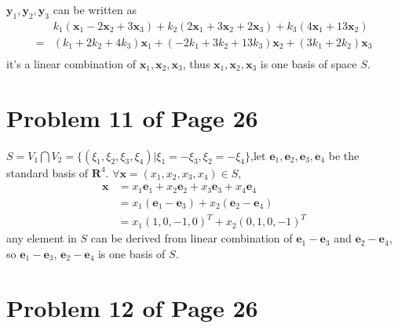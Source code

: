\documentclass[12pt,a4paper]{article}
\newcommand{\mysection}[2]{
\section{Problem #1 of Page #2}	
	}
\begin{document}
$\bm{y}_1,\bm{y}_2,\bm{y}_3$ can be written as
\begin{equation} 
\begin{split}
&k_1 (\bm{x}_1 - 2\bm{x}_2 + 3\bm{x}_3)+
 k_2(2\bm{x}_1 + 3\bm{x}_2 + 2\bm{x}_3)
 + k_3(4\bm{x}_1 + 13\bm{x}_2) \\
 =& (k_1 + 2k_2 + 4k_3)\bm{x}_1 + 
 (-2k_1+3k_2 + 13k_3)\bm{x}_2 +
 (3k_1 + 2k_2)\bm{x}_3 \\
\end{split}
\end{equation}
it's a linear combination of $\bm{x}_1,\bm{x}_2,\bm{x}_3$,
thus $\bm{x}_1,\bm{x}_2,\bm{x}_3$ is one basis of space ${S}$.
\mysection{11}{26} 
${S} = {V}_1 \bigcap  {V}_2 =
\{(\xi_1,\xi_2,\xi_3,\xi_4)|\xi_1 = -\xi_3, \xi_2 = -\xi_4
\}
$,let $\bm{e}_1,\bm{e}_2,\bm{e}_3,\bm{e}_4$
be the standard basis of $\mathbf{R}^{4}$.
$\forall \bm{x} = (x_1,x_2,x_3,x_4) \in {S}$, \\
\begin{equation}
\begin{split}
\bm{x} &= x_1 \bm{e}_1 + x_2\bm{e}_2 + x_3\bm{e}_3 + x_4\bm{e}_4 \\
&= x_1(\bm{e}_1 -\bm{e}_3) + x_2(\bm{e}_2 - \bm{e}_4) \\
& = x_1(1,0,-1,0)^{T} + x_2 (0,1,0,-1)^{T}
\end{split} 
\end{equation} 
any element in ${S}$ can be derived from linear combination of
$\bm{e}_1 - \bm{e}_3$ and $\bm{e}_2 - \bm{e}_4$,
so $\bm{e}_1 - \bm{e}_3$, $\bm{e}_2 - \bm{e}_4$ is one basis of ${S}$.
\mysection{12}{26}
\end{document}
